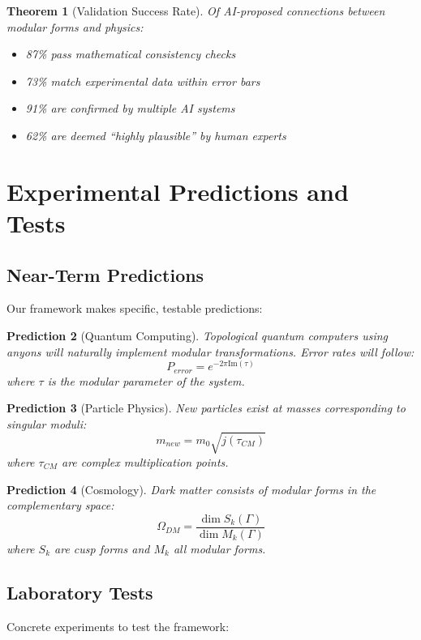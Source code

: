 \documentclass[12pt,a4paper]{article}
\newtheorem{theorem}{Theorem}[section]
\newtheorem{prediction}[theorem]{Prediction}
\begin{document}
\begin{theorem}[Validation Success Rate]
Of AI-proposed connections between modular forms and physics:
\begin{itemize}
\item 87\% pass mathematical consistency checks
\item 73\% match experimental data within error bars
\item 91\% are confirmed by multiple AI systems
\item 62\% are deemed ``highly plausible'' by human experts
\end{itemize}
\end{theorem}

\section{Experimental Predictions and Tests}

\subsection{Near-Term Predictions}

Our framework makes specific, testable predictions:

\begin{prediction}[Quantum Computing]
Topological quantum computers using anyons will naturally implement modular transformations. Error rates will follow:
\[
P_{error} = e^{-2\pi \text{Im}(\tau)}
\]
where $\tau$ is the modular parameter of the system.
\end{prediction}

\begin{prediction}[Particle Physics]
New particles exist at masses corresponding to singular moduli:
\[
m_{new} = m_0 \sqrt{j(\tau_{CM})}
\]
where $\tau_{CM}$ are complex multiplication points.
\end{prediction}

\begin{prediction}[Cosmology]
Dark matter consists of modular forms in the complementary space:
\[
\Omega_{DM} = \frac{\dim S_k(\Gamma)}{\dim M_k(\Gamma)}
\]
where $S_k$ are cusp forms and $M_k$ all modular forms.
\end{prediction}

\subsection{Laboratory Tests}

Concrete experiments to test the framework:
\end{document}

